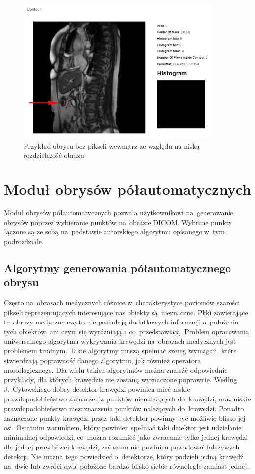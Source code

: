 \documentclass[a4paper,11pt,twoside,openright]{report}
\theoremstyle{definition}
\begin{document}
\begin{figure}[h]
	\center
	\includegraphics[width=0.9\textwidth]{manualny-0px}
	\caption{Przykład obrysu bez pikseli wewnątrz ze względu na niską rozdzielczość obrazu}
    	\label{fig:manual-0px}
\end{figure}

\section {Moduł obrysów półautomatycznych}

Moduł obrysów półautomatycznych pozwala użytkownikowi na~generowanie
obrysów poprzez wybieranie punktów na~obrazie DICOM. Wybrane punkty łączone są
ze sobą na~podstawie autorskiego algorytmu opisanego w~tym podrozdziale.

\subsection {Algorytmy generowania półautomatycznego obrysu}

Często na~obrazach medycznych różnice w~charakterystyce poziomów szarości pikseli
reprezentujących interesujące nas obiekty są~nieznaczne. Pliki zawierające te~obrazy medyczne często nie posiadają
dodatkowych informacji o~położeniu tych obiektów, ani czym się wyróżniają i~co~przedstawiają.
Problem opracowania uniwersalnego algorytmu wykrywania krawędzi na~obrazach medycznych
jest problemem trudnym. Takie algorytmy muszą spełniać szereg wymagań,
które stwierdzają poprawność danego algorytmu, jak również operatora morfologicznego.
Dla wielu takich algorytmów można znaleźć odpowiednie przykłady,
dla których krawędzie nie zostaną wyznaczone poprawnie. Według J.~Cytowskiego \cite{Cyfrowe przetwarzanie
obrazów medycznych} dobry detektor krawędzi powinien mieć niskie prawdopodobieństwo
zaznaczenia punktów nienależących do~krawędzi, oraz niskie prawdopodobieństwo
niezaznaczenia punktów należących do~krawędzi. Ponadto zaznaczone punkty krawędzi
przez taki detektor powinny być możliwie blisko jej osi. Ostatnim warunkiem, który powinien
spełniać taki detektor jest udzielanie minimalnej odpowiedzi, co~można rozumieć jako zwracanie
tylko jednej krawędzi dla jednej prawdziwej krawędzi, zaś szum nie powinien powodować
fałszywych detekcji. Nie można tego powiedzieć o~detektorze, który podzieli jedną krawędź
na~dwie lub zwróci dwie położone bardzo blisko siebie równoległe zamiast jednej.
\end{document}
